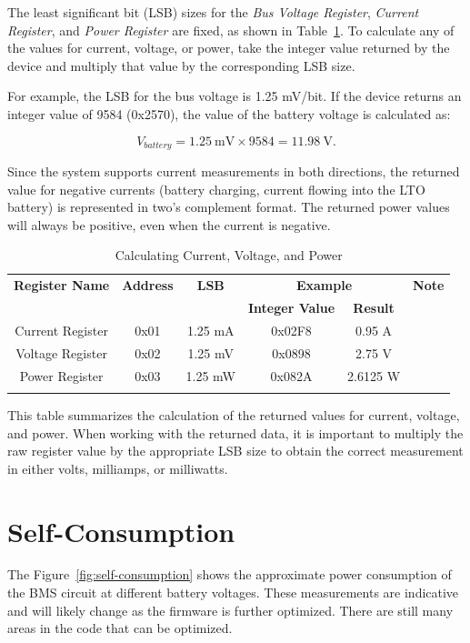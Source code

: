 \documentclass[11pt]{datasheet}
\begin{document}
The least significant bit (LSB) sizes for the \textit{Bus Voltage Register},
\textit{Current Register}, and \textit{Power Register} are fixed, as shown in
Table~\ref{tab:register_calculations}. To calculate any of the values
for current, voltage, or power, take the integer value returned by
the device and multiply that value by the corresponding LSB size.

For example, the LSB for the bus voltage is 1.25 mV/bit. If the device
returns an integer value of 9584 (0x2570), the value of the battery voltage
is calculated as:

\[
V_{battery} = 1.25\ \text{mV} \times 9584 = 11.98\ \text{V}.
\]

Since the system supports current measurements in both directions,
the returned value for negative currents (battery charging, current
flowing into the LTO battery) is represented in two's complement
format. The returned power values will always be positive, even
when the current is negative.

\begin{table}[ht]
\centering
\caption{Calculating Current, Voltage, and Power}
\begin{tabularx}{\textwidth}{c|c|c|c|c|c}
\thickhline
\textbf{Register Name} & \textbf{Address} & \textbf{LSB} & \multicolumn{2}{c|}{\textbf{Example}} & \textbf{Note} \\
\cline{4-5}
& & & \textbf{Integer Value} & \textbf{Result} & \\ 
\hline
Current Register & 0x01 & 1.25 mA & 0x02F8 & 0.95 A & \\
Voltage Register & 0x02 & 1.25 mV & 0x0898 & 2.75 V & \\
Power Register & 0x03 & 1.25 mW & 0x082A & 2.6125 W & \\
\thickhline
\end{tabularx}
\label{tab:register_calculations}
\end{table}

This table summarizes the calculation of the returned values for
current, voltage, and power. When working with the returned data,
it is important to multiply the raw register value by the
appropriate LSB size to obtain the correct measurement in either
volts, milliamps, or milliwatts.

\section{Self-Consumption}

The Figure~\ref{fig:self-consumption} shows the approximate power consumption of
the BMS circuit at different battery voltages. These measurements
are indicative and will likely change as the firmware is further
optimized. There are still many areas in the code that can be optimized.
\end{document}
